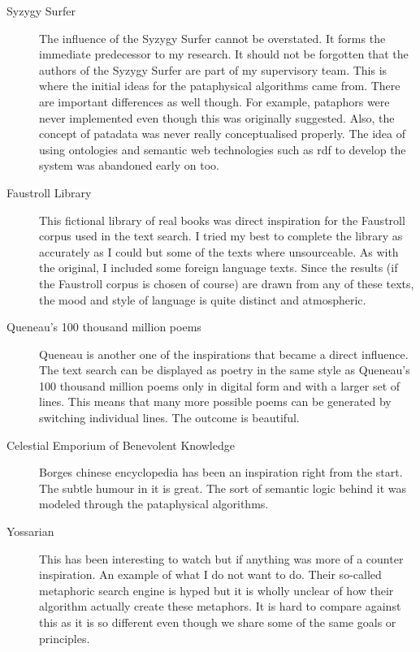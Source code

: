 \begin{description}
  \item[Syzygy Surfer] The influence of the Syzygy Surfer cannot be overstated. It forms the immediate predecessor to my research. It should not be forgotten that the authors of the Syzygy Surfer are part of my supervisory team. This is where the initial ideas for the pataphysical algorithms came from. There are important differences as well though. For example, pataphors were never implemented even though this was originally suggested. Also, the concept of patadata was never really conceptualised properly. The idea of using ontologies and semantic web technologies such as \gls{rdf} to develop the system was abandoned early on too.
  \item[Faustroll Library] This fictional library of real books was direct inspiration for the Faustroll corpus used in the text search. I tried my best to complete the library as accurately as I could but some of the texts where unsourceable. As with the original, I included some foreign language texts. Since the results (if the Faustroll corpus is chosen of course) are drawn from any of these texts, the mood and style of language is quite distinct and atmospheric.
  \item[Queneau's 100 thousand million poems] Queneau is another one of the inspirations that became a direct influence. The text search can be displayed as poetry in the same style as Queneau's 100 thousand million poems only in digital form and with a larger set of lines. This means that many more possible poems can be generated by switching individual lines. The outcome is beautiful.
  \item[Celestial Emporium of Benevolent Knowledge] Borges chinese encyclopedia has been an inspiration right from the start. The subtle humour in it is great. The sort of semantic logic behind it was modeled through the pataphysical algorithms.
  \item[Yossarian] This has been interesting to watch but if anything was more of a counter inspiration. An example of what I do not want to do. Their so-called metaphoric search engine is hyped but it is wholly unclear of how their algorithm actually create these metaphors. It is hard to compare against this as it is so different even though we share some of the same goals or principles.

\end{description}
